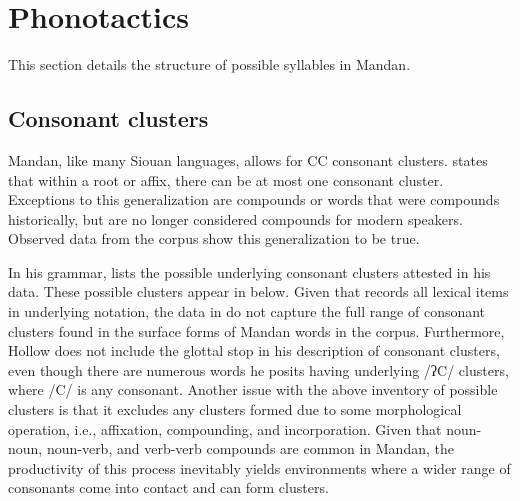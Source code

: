 \section{Phonotactics}\label{SecPhonotactics}

This section details the structure of possible syllables in Mandan.

\subsection{Consonant clusters}\label{consonantclusters}

Mandan, like many Siouan languages, allows for CC consonant clusters. \citet[16]{hollow1970} states that within a root or affix, there can be at most one consonant cluster. Exceptions to this generalization are compounds or words that were compounds historically, but are no longer considered compounds for modern speakers. Observed data from the corpus show this generalization to be true.

In his grammar, \citet[17]{hollow1970} lists the possible underlying consonant clusters attested in his data. These possible clusters appear in  below. Given that \citet{hollow1970} records all lexical items in underlying notation, the data in  do not capture the full range of consonant clusters found in the surface forms of Mandan words in the corpus. Furthermore, Hollow does not include the glottal stop in his description of consonant clusters, even though there are numerous words he posits having underlying /ʔC/ clusters, where /C/ is any consonant. Another issue with the above inventory of possible clusters is that it excludes any clusters formed due to some morphological operation, i.e., affixation, compounding, and incorporation. Given that noun-noun, noun-verb, and verb-verb compounds are common in Mandan, the productivity of this process inevitably yields environments where a wider range of consonants come into contact and can form clusters.

